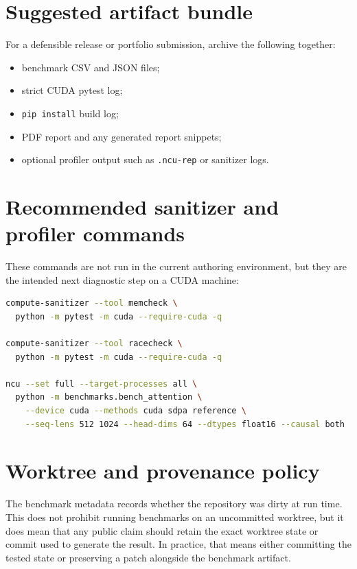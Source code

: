 \section{Suggested artifact bundle}

For a defensible release or portfolio submission, archive the following together:
\begin{itemize}
  \item benchmark CSV and JSON files;
  \item strict CUDA pytest log;
  \item \texttt{pip install} build log;
  \item PDF report and any generated report snippets;
  \item optional profiler output such as \texttt{.ncu-rep} or sanitizer logs.
\end{itemize}

\section{Recommended sanitizer and profiler commands}

These commands are not run in the current authoring environment, but they are the intended next diagnostic step on a CUDA machine:
\begin{lstlisting}[language=bash,caption={Examples for deeper validation on a CUDA host.}]
compute-sanitizer --tool memcheck \
  python -m pytest -m cuda --require-cuda -q

compute-sanitizer --tool racecheck \
  python -m pytest -m cuda --require-cuda -q

ncu --set full --target-processes all \
  python -m benchmarks.bench_attention \
    --device cuda --methods cuda sdpa reference \
    --seq-lens 512 1024 --head-dims 64 --dtypes float16 --causal both
\end{lstlisting}

\section{Worktree and provenance policy}

The benchmark metadata records whether the repository was dirty at run time. This does not prohibit running benchmarks on an uncommitted worktree, but it does mean that any public claim should retain the exact worktree state or commit used to generate the result. In practice, that means either committing the tested state or preserving a patch alongside the benchmark artifact.


